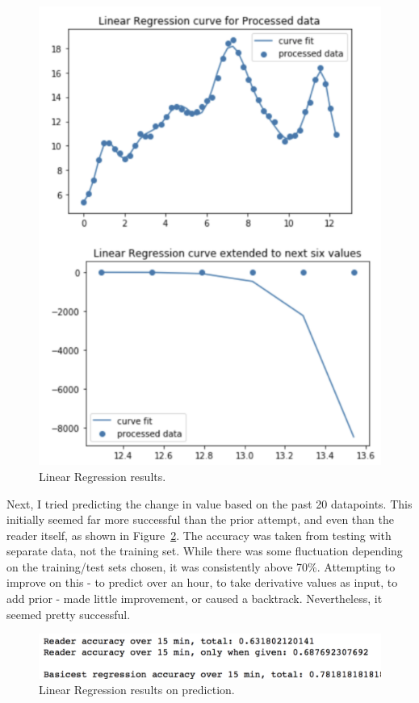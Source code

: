 \begin{figure}[H]
\centering\includegraphics[width=1.0\linewidth]{images/graph6.png}
\caption{Linear Regression results.}
\label{fig:graph6}
\end{figure}

Next, I tried predicting the change in value based on the past 20 datapoints. This initially seemed far more successful than the prior attempt, and even than the reader itself, as shown in Figure~\ref{fig:graph6_5}. The accuracy was taken from testing with separate data, not the training set. While there was some fluctuation depending on the training/test sets chosen, it was consistently above 70\%. Attempting to improve on this - to predict over an hour, to take derivative values as input, to add prior - made little improvement, or caused a backtrack. Nevertheless, it seemed pretty successful.

\begin{figure}[H]
\centering\includegraphics[width=1.0\linewidth]{images/graph6_5.png}
\caption{Linear Regression results on prediction.}
\label{fig:graph6_5}
\end{figure}

